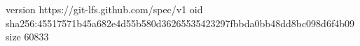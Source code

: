 version https://git-lfs.github.com/spec/v1
oid sha256:45517571b45a682e4d55b580d36265535423297fbbda0bb48dd8bc098d6f4b09
size 60833
